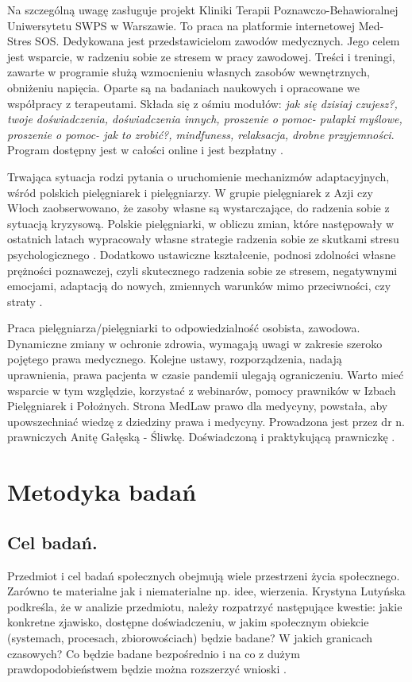 \documentclass[a4paper,12pt,twoside,openright]{mwrep}
\begin{document}
Na szczególną uwagę zasługuje projekt Kliniki Terapii Poznawczo-Behawioralnej Uniwersytetu SWPS w Warszawie. To praca na platformie internetowej Med-Stres SOS. Dedykowana jest przedstawicielom zawodów medycznych. Jego celem jest wsparcie, w radzeniu sobie ze stresem w pracy zawodowej. Treści i treningi, zawarte w programie służą wzmocnieniu własnych zasobów wewnętrznych, obniżeniu napięcia. Oparte są na badaniach naukowych i opracowane we współpracy z terapeutami. Składa się z ośmiu modułów: \textit{jak się dzisiaj czujesz?, twoje doświadczenia, doświadczenia innych, proszenie o pomoc- pułapki myślowe, proszenie o pomoc- jak to zrobić?, mindfuness, relaksacja, drobne przyjemności}. Program dostępny jest w całości online i jest bezpłatny \cite{projekt}.

Trwająca sytuacja rodzi pytania o uruchomienie mechanizmów adaptacyjnych, wśród polskich pielęgniarek i pielęgniarzy. W grupie pielęgniarek z Azji czy Włoch zaobserwowano, że zasoby własne są wystarczające, do radzenia sobie z sytuacją kryzysową. Polskie pielęgniarki, w obliczu zmian, które następowały w ostatnich latach wypracowały własne strategie radzenia sobie ze skutkami stresu psychologicznego \cite{covid}. Dodatkowo ustawiczne kształcenie, podnosi zdolności własne prężności poznawczej, czyli skutecznego radzenia sobie ze stresem, negatywnymi emocjami, adaptacją do nowych, zmiennych warunków mimo przeciwności, czy straty \cite{preznosc}. 
 
Praca pielęgniarza/pielęgniarki to odpowiedzialność osobista, zawodowa. Dynamiczne zmiany w ochronie zdrowia, wymagają uwagi w zakresie szeroko pojętego prawa medycznego. Kolejne ustawy, rozporządzenia, nadają uprawnienia, prawa pacjenta w czasie pandemii ulegają ograniczeniu. Warto mieć wsparcie w tym względzie, korzystać z webinarów, pomocy prawników w Izbach Pielęgniarek i Położnych. Strona MedLaw prawo dla medycyny, powstała, aby upowszechniać wiedzę z dziedziny prawa i medycyny. Prowadzona jest przez dr n. prawniczych Anitę Gałęską - Śliwkę. Doświadczoną i praktykującą prawniczkę \cite{anita}.


\chapter{Metodyka badań}

\section{Cel badań.}
Przedmiot i cel badań społecznych obejmują wiele przestrzeni życia społecznego. Zarówno te materialne jak i niematerialne np. idee, wierzenia. Krystyna Lutyńska podkreśla, że w analizie przedmiotu, należy rozpatrzyć następujące kwestie: jakie konkretne zjawisko, dostępne doświadczeniu, w jakim społecznym obiekcie (systemach, procesach, zbiorowościach) będzie badane? W jakich granicach czasowych? Co będzie badane bezpośrednio i na co z dużym prawdopodobieństwem będzie można rozszerzyć wnioski \cite{krys}.
\end{document}
